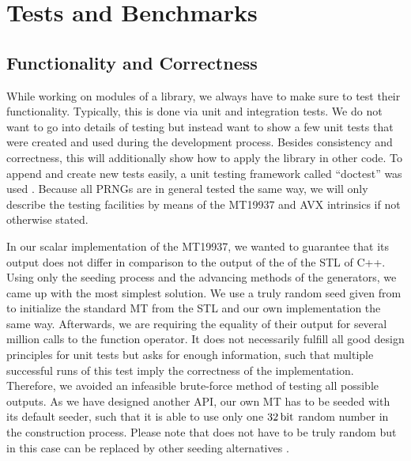 \documentclass{stdlocal}
\begin{document}
\section{Tests and Benchmarks} %
\label{sec:testing_framework}

  \subsection{Functionality and Correctness} %
  \label{sub:unit_tests}
    While working on modules of a library, we always have to make sure to test their functionality.
    Typically, this is done via unit and integration tests.
    We do not want to go into details of testing but instead want to show a few unit tests that were created and used during the development process.
    Besides consistency and correctness, this will additionally show how to apply the library in other code.
    To append and create new tests easily, a unit testing framework called \enquote{doctest} was used \autocite{doctest}.
    Because all PRNGs are in general tested the same way, we will only describe the testing facilities by means of the MT19937 and AVX intrinsics if not otherwise stated.

    In our scalar implementation of the MT19937, we wanted to guarantee that its output does not differ in comparison to the output of the  of the STL of C++.
    Using only the seeding process and the advancing methods of the generators, we came up with the most simplest solution.
    We use a truly random seed given from  to initialize the standard MT from the STL and our own implementation the same way.
    Afterwards, we are requiring the equality of their output for several million calls to the function operator.
    It does not necessarily fulfill all good design principles for unit tests but asks for enough information, such that multiple successful runs of this test imply the correctness of the implementation.
    Therefore, we avoided an infeasible brute-force method of testing all possible outputs.
    As we have designed another API, our own MT has to be seeded with its default seeder, such that it is able to use only one $32\, \mathrm{bit}$ random number in the construction process.
    Please note that  does not have to be truly random \autocite{oneill-blog-rd,oneill-blog-seeding-surprises} but in this case can be replaced by other seeding alternatives \autocite{oneill-blog-seed-entropy}.
\end{document}
